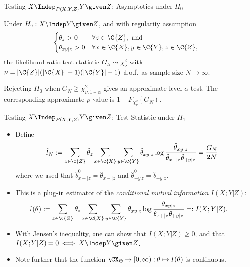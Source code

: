 \begin{frame}{Testing $X \Indep_{P(X,Y,Z)} Y \given Z$: Asymptotics under $H_0$}
\begin{Prp}[\ref{prp:cond_G_test_asymptotics_H0}]
Under $H_0 : X \Indep Y \given Z$, and with regularity assumption 
\begin{equation*}
  \begin{cases}
    \theta_z > 0 & \forall z \in \C{Z}, \text{ and}\\
    \theta_{xy|z} > 0 & \forall x \in \C{X}, y\in \C{Y}, z\in \C{Z},
  \end{cases}
\end{equation*}
the likelihood ratio test statistic $G_N \leadsto \chi_\nu^2$ 
with $\nu = |\C{Z}|(|\C{X}| - 1)(|\C{Y}| - 1)$ d.o.f.\ as sample size $N \to \infty$.
\end{Prp}
  \begin{Cor}
  Rejecting $H_0$ when $G_N \ge \chi_{\nu,1-\alpha}^2$ gives an approximate level $\alpha$ test.
  The corresponding approximate $p$-value is $1-F_{\chi^2_\nu}(G_N)$.
\end{Cor}
\end{frame}

\begin{frame}{Testing $X \Indep_{P(X,Y,Z)} Y \given Z$: Test Statistic under $H_1$}
  \begin{itemize}
    \item Define
$$\hat I_N := \sum_{z\in\C{Z}} \hat\theta_{z} \sum_{x\in\C{X}} \sum_{y\in\C{Y}} \hat \theta_{xy|z} \log \frac{\hat \theta_{xy|z}}{\hat \theta_{x+|z} \hat \theta_{+ y|z}}
    = \frac{G_N}{2N}$$
where we used that $\hat\theta^0_{x +|z} = \hat\theta_{x +|z}$ and $\hat\theta^0_{+ y|z} = \hat\theta_{+ y|z}$.
\item This is a plug-in estimator of the \emph{conditional mutual information} $I(X;Y|Z)$:
\begin{equation*}\begin{split}
  I(\theta) 
  & := \sum_{z\in\C{Z}} \theta_z \sum_{x\in\C{X}}\sum_{y\in\C{Y}} \theta_{xy|z} \log \frac{\theta_{xy|z}}{\theta_{x +|z} \theta_{+ y|z}} 
  =: I(X;Y|Z).
\end{split}\end{equation*}
\item With Jensen's inequality, one can show that $I(X;Y|Z) \ge 0$, and that $I(X;Y|Z) = 0 \iff X \Indep Y \given Z$.
\item Note further that the function $\CX_\Theta \to [0,\infty) : \theta \mapsto I(\theta)$ is continuous.
  \end{itemize}
\end{frame}

